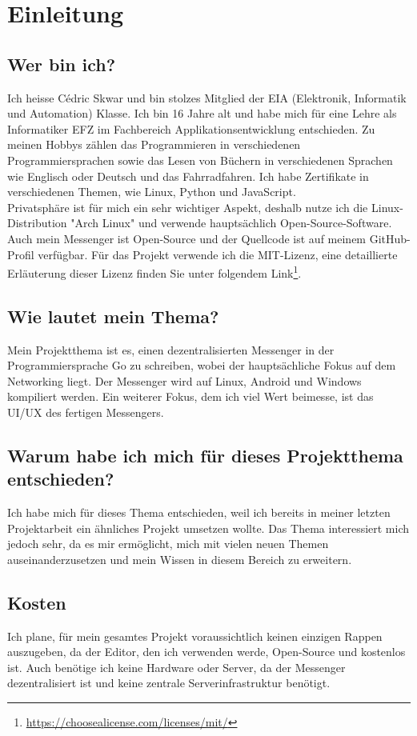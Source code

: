 \section{Einleitung}
\subsection{Wer bin ich?}
Ich heisse Cédric Skwar und bin stolzes Mitglied der EIA (Elektronik, Informatik und Automation) Klasse. Ich bin 16 Jahre alt und habe mich für eine Lehre als Informatiker EFZ im Fachbereich Applikationsentwicklung entschieden. Zu meinen Hobbys zählen das Programmieren in verschiedenen Programmiersprachen sowie das Lesen von Büchern in verschiedenen Sprachen wie Englisch oder Deutsch und das Fahrradfahren.
Ich habe Zertifikate in verschiedenen Themen, wie Linux, Python und JavaScript.\\
Privatsphäre ist für mich ein sehr wichtiger Aspekt, deshalb nutze ich die Linux-Distribution "Arch Linux" und verwende hauptsächlich Open-Source-Software. Auch mein Messenger ist Open-Source und der Quellcode ist auf meinem GitHub-Profil verfügbar. Für das Projekt verwende ich die MIT-Lizenz, eine detaillierte Erläuterung dieser Lizenz finden Sie unter folgendem Link\footnote{\hyperlink{https://choosealicense.com/licenses/mit/}{https://choosealicense.com/licenses/mit/}}.
\subsection{Wie lautet mein Thema?}
Mein Projektthema ist es, einen dezentralisierten Messenger in der Programmiersprache Go zu schreiben, wobei der hauptsächliche Fokus auf dem Networking liegt. Der Messenger wird auf Linux, Android und Windows kompiliert werden. Ein weiterer Fokus, dem ich viel Wert beimesse, ist das UI/UX des fertigen Messengers.
\subsection{Warum habe ich mich für dieses Projektthema entschieden?}
Ich habe mich für dieses Thema entschieden, weil ich bereits in meiner letzten Projektarbeit ein ähnliches Projekt umsetzen wollte. Das Thema interessiert mich jedoch sehr, da es mir ermöglicht, mich mit vielen neuen Themen auseinanderzusetzen und mein Wissen in diesem Bereich zu erweitern.
\subsection{Kosten}
Ich plane, für mein gesamtes Projekt voraussichtlich keinen einzigen Rappen auszugeben, da der Editor, den ich verwenden werde, Open-Source und kostenlos ist. Auch benötige ich keine Hardware oder Server, da der Messenger dezentralisiert ist und keine zentrale Serverinfrastruktur benötigt.

